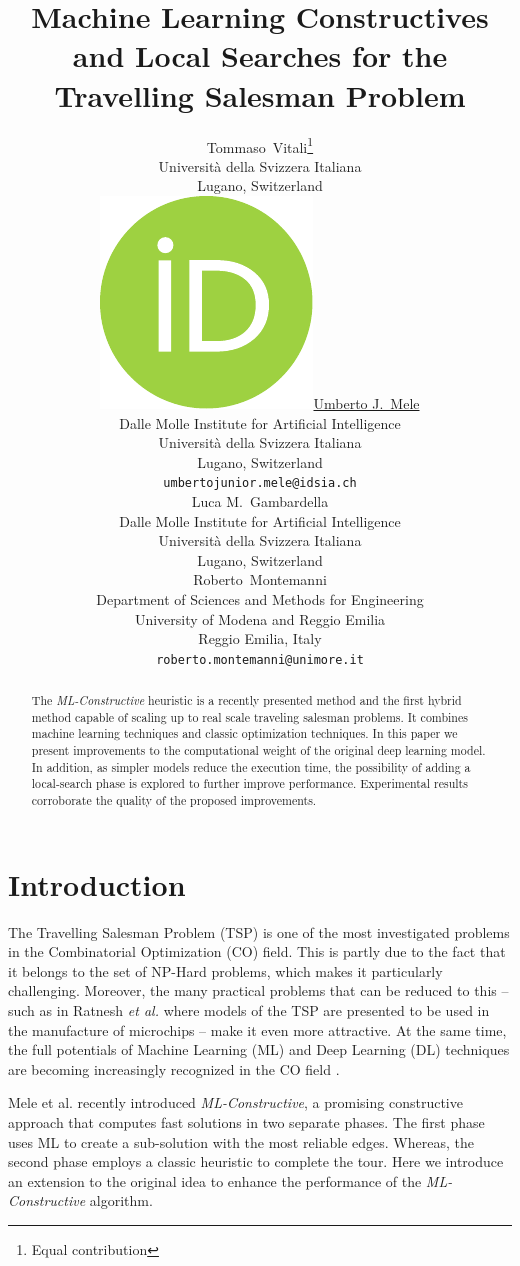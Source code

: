 \documentclass{article}
\title{Machine Learning Constructives and Local Searches for the Travelling Salesman Problem}
\author{ 
    Tommaso~Vitali\thanks{Equal contribution} \\
	Universit\`{a} della Svizzera Italiana\\
    Lugano, Switzerland\\
	\And
	\href{https://orcid.org/0000-0002-8464-1889}{\includegraphics[scale=0.06]{orcid.pdf}\hspace{1mm}Umberto J.~Mele\footnotemark[1]} \\
	Dalle Molle Institute for Artificial Intelligence\\
	Universit\`{a} della Svizzera Italiana\\
    Lugano, Switzerland\\
	\texttt{umbertojunior.mele@idsia.ch} \\
	\AND
    Luca M.~Gambardella \\
    Dalle Molle Institute for Artificial Intelligence\\
	Universit\`{a} della Svizzera Italiana\\
    Lugano, Switzerland\\
    \And 
    Roberto~Montemanni \\
    Department of Sciences and Methods for Engineering\\
    University of Modena and Reggio Emilia\\
    Reggio Emilia, Italy\\
    \texttt{roberto.montemanni@unimore.it}\\
}
\begin{document}
\maketitle

\begin{abstract}
The \emph{ML-Constructive} heuristic is a recently presented method and the first hybrid method capable of scaling up to real scale traveling salesman problems. It combines machine learning techniques and classic optimization techniques.
In this paper we present improvements to the computational weight of the original deep learning model. In addition, as simpler models reduce the execution time, the possibility of adding a local-search phase is explored to further improve performance.
Experimental results corroborate the quality of the proposed improvements.
\end{abstract}




\section{Introduction} \label{introduction}

The Travelling Salesman Problem (TSP) is one of the most investigated problems in the Combinatorial Optimization (CO) field. This is partly due to the fact that it belongs to the set of NP-Hard problems, which makes it particularly challenging. 
Moreover, the many practical problems that can be reduced to this -- such as in Ratnesh \emph{et al.} \cite{ratnesh} where models of the TSP are presented to be used in the manufacture of microchips -- make it even more attractive.
At the same time, the full potentials of Machine Learning (ML) and Deep Learning (DL)  techniques are becoming increasingly recognized in the CO field \cite{survey}.

Mele et al. \cite{mele:gambardella:montemanni} recently introduced \textit{ML-Constructive}, a promising constructive approach that computes fast solutions in two separate phases.
The first phase uses ML to create a sub-solution with the most reliable edges.
Whereas, the second phase employs a classic heuristic to complete the tour.
Here we introduce an extension to the original idea to enhance the performance of the \textit{ML-Constructive} algorithm. 

\vspace{5 pt}
\end{document}
